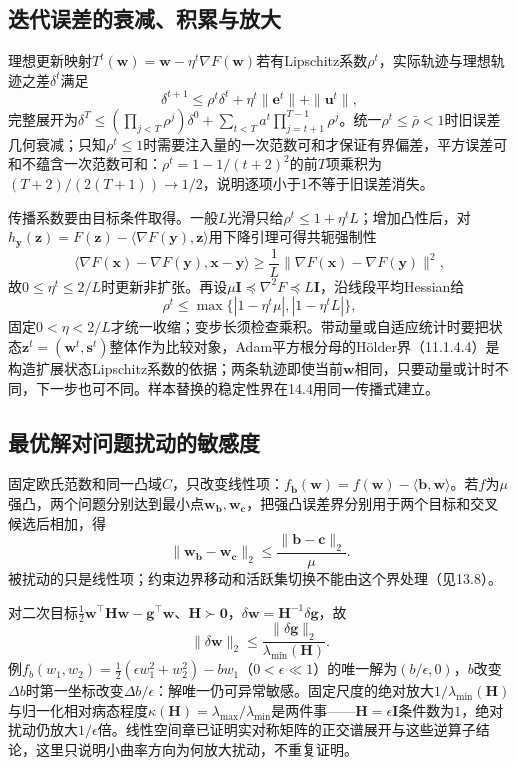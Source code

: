 \subsection{迭代误差的衰减、积累与放大}

理想更新映射$T^t(\bm w)=\bm w-\eta^t\nabla F(\bm w)$若有Lipschitz系数$\rho^t$，实际轨迹与理想轨迹之差$\delta^t$满足
\begin{equation}
 \delta^{t+1}\leq\rho^t\delta^t+\eta^t\|\bm e^t\|+\|\bm u^t\|,
 \label{eq:opt-inexact-gradient-recurrence}
\end{equation}
完整展开为$\delta^T\leq(\prod_{j<T}\rho^j)\delta^0+\sum_{t<T}a^t\prod_{j=t+1}^{T-1}\rho^j$。统一$\rho^t\leq\bar\rho<1$时旧误差几何衰减；只知$\rho^t\leq1$时需要注入量的一次范数可和才保证有界偏差，平方误差可和不蕴含一次范数可和：$\rho^t=1-1/(t+2)^2$的前$T$项乘积为$(T+2)/(2(T+1))\to1/2$，说明逐项小于1不等于旧误差消失。

传播系数要由目标条件取得。一般$L$光滑只给$\rho^t\leq1+\eta^tL$；增加凸性后，对$h_{\bm y}(\bm z)=F(\bm z)-\langle\nabla F(\bm y),\bm z\rangle$用下降引理可得共轭强制性
\[
 \langle\nabla F(\bm x)-\nabla F(\bm y),\bm x-\bm y\rangle
 \geq\frac1L\|\nabla F(\bm x)-\nabla F(\bm y)\|^2,
\]
故$0\leq\eta^t\leq2/L$时更新非扩张。再设$\mu\bm I\preceq\nabla^2F\preceq L\bm I$，沿线段平均Hessian给
\[
 \rho^t\leq\max\{|1-\eta^t\mu|,|1-\eta^tL|\},
\]
固定$0<\eta<2/L$才统一收缩；变步长须检查乘积。带动量或自适应统计时要把状态$\bm z^t=(\bm w^t,\bm s^t)$整体作为比较对象，Adam平方根分母的Hölder界（11.1.4.4）是构造扩展状态Lipschitz系数的依据；两条轨迹即使当前$\bm w$相同，只要动量或计时不同，下一步也可不同。样本替换的稳定性界在14.4用同一传播式建立。

\subsection{最优解对问题扰动的敏感度}

\label{sec:opt-solution-perturbation}%
固定欧氏范数和同一凸域$C$，只改变线性项：$f_{\bm b}(\bm w)=f(\bm w)-\langle\bm b,\bm w\rangle$。若$f$为$\mu$强凸，两个问题分别达到最小点$\bm w_{\bm b},\bm w_{\bm c}$，把强凸误差界分别用于两个目标和交叉候选后相加，得
\[
 \|\bm w_{\bm b}-\bm w_{\bm c}\|_2
 \leq\frac{\|\bm b-\bm c\|_2}{\mu}.
\]
被扰动的只是线性项；约束边界移动和活跃集切换不能由这个界处理（见13.8）。

对二次目标$\frac12\bm w^\top\bm H\bm w-\bm g^\top\bm w$、$\bm H\succ\bm0$，$\delta\bm w=\bm H^{-1}\delta\bm g$，故
\[
 \|\delta\bm w\|_2\leq\frac{\|\delta\bm g\|_2}{\lambda_{\min}(\bm H)}.
\]
例$f_b(w_1,w_2)=\frac12(\epsilon w_1^2+w_2^2)-bw_1$（$0<\epsilon\ll1$）的唯一解为$(b/\epsilon,0)$，$b$改变$\Delta b$时第一坐标改变$\Delta b/\epsilon$：解唯一仍可异常敏感。固定尺度的绝对放大$1/\lambda_{\min}(\bm H)$与归一化相对病态程度$\kappa(\bm H)=\lambda_{\max}/\lambda_{\min}$是两件事——$\bm H=\epsilon\bm I$条件数为$1$，绝对扰动仍放大$1/\epsilon$倍。线性空间章已证明实对称矩阵的正交谱展开与这些逆算子结论，这里只说明小曲率方向为何放大扰动，不重复证明。

